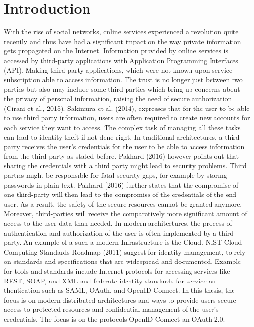 \chapter{Introduction}\label{chap:introduction}
\chapterstart

With the rise of social networks, online services experienced a revolution quite recently and thus have had a significant impact on the way private information gets propagated on the Internet. Information provided by online services is accessed by third-party applications with Application Programming Interfaces (API). Making third-party applications, which were not known upon service subscription able to access information. The trust is no longer just between two parties but also may include some third-parties which bring up concerns about the privacy of personal information, raising the need of secure authorization (Cirani et al., 2015).
Sakimura et al. (2014), expresses that for the user to be able to use third party information, users are often required to create new accounts for each service they want to access. The complex task of managing all these tasks can lead to identity theft if not done right. 
In traditional architectures, a third party receives the user’s credentials for the user to be able to access information from the third party as stated before. Pakhard (2016) however points out that sharing the credentials with a third party might lead to security problems. Third parties might be responsible for fatal security gaps, for example by storing passwords in plain-text. Pakhard (2016) further states that the compromise of one third-party will then lead to the compromise of the credentials of the end user. As a result, the safety of the secure resources cannot be granted anymore. Moreover, third-parties will receive the comparatively more significant amount of access to the user data than needed.
In modern architectures, the process of authentication and authorization of the user is often implemented by a third party. An example of a such a modern Infrastructure is the Cloud. NIST Cloud Computing Standards Roadmap (2011) suggest for identity management, to rely on standards and specifications that are widespread and documented. Example for tools and standards include Internet protocols for accessing services like REST, SOAP, and XML and federate identity standards for service au-thentication such as SAML, OAuth, and OpenID Connect.
In this thesis, the focus is on modern distributed architectures and ways to provide users secure access to protected resources and confidential management of the user’s credentials. The focus is on the protocols OpenID Connect an OAuth 2.0. 





